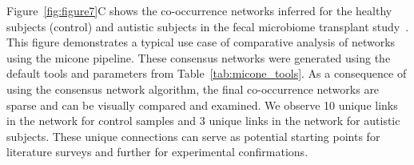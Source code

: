   Figure~\ref{fig:figure7}C shows the co-occurrence networks inferred for the healthy subjects (control) and autistic subjects in the fecal microbiome transplant study~\cite{Kang2017}.
  This figure demonstrates a typical use case of comparative analysis of networks using the \ac{micone} pipeline.
  These consensus networks were generated using the default tools and parameters from Table~\ref{tab:micone_tools}.
  As a consequence of using the consensus network algorithm, the final co-occurrence networks are sparse and can be visually compared and examined.
  We observe 10 unique links in the network for control samples and 3 unique links in the network for autistic subjects.
  These unique connections can serve as potential starting points for literature surveys and further for experimental confirmations.

